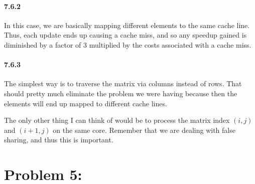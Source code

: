 \documentclass[a4paper]{article}
\begin{document}
\paragraph{7.6.2} In this case, we are basically mapping different elements to the same cache line. Thus, each update ends up causing a cache miss, and so any speedup gained is diminished by a factor of 3 multiplied by the costs associated with a cache miss.

\paragraph{7.6.3} The simplest way is to traverse the matrix via columns instead of rows. That should pretty much eliminate the problem we were having because then the elements will end up mapped to different cache lines.

The only other thing I can think of would be to process the matrix index $(i,j)$ and $(i+1,j)$ on the same core. Remember that we are dealing with false sharing, and thus this is important.

\section*{Problem 5:}
\end{document}
